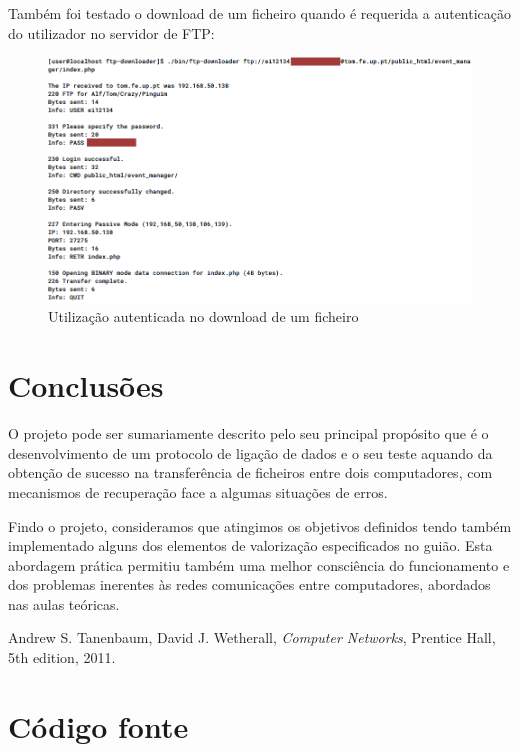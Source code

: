\documentclass[a4paper,11pt,titlepage]{article}
\begin{document}
Também foi testado o download de um ficheiro quando é requerida a autenticação do utilizador no servidor de FTP:

\begin{figure}[H]
    \center
    \includegraphics[scale=0.45]{res/authenticated.png}
    \caption{Utilização autenticada no download de um ficheiro}
    \label{fig:authenticated.png}
\end{figure}

\section{Conclusões}

O projeto pode ser sumariamente descrito pelo seu principal propósito que é o desenvolvimento de um protocolo de ligação de dados e o seu teste aquando da obtenção de sucesso na transferência de ficheiros entre dois computadores, com mecanismos de recuperação face a algumas situações de erros. 


Findo o projeto, consideramos que atingimos os objetivos definidos tendo também implementado alguns dos elementos de valorização especificados no guião. Esta abordagem prática permitiu também uma melhor consciência do funcionamento e dos problemas inerentes às redes comunicações entre computadores, abordados nas aulas teóricas.

\begin{thebibliography}{9}
  Andrew S. Tanenbaum,
  David J. Wetherall,
  \emph{Computer Networks},
  Prentice Hall, 
  5th edition,
  2011.
\end{thebibliography}

\appendix
\section{Código fonte}
\end{document}
